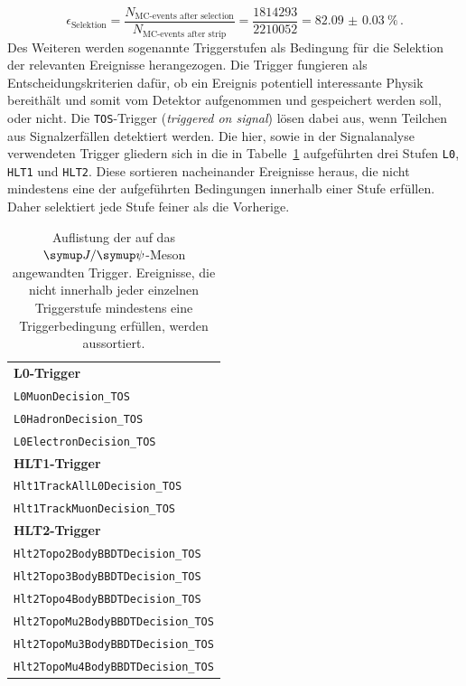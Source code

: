 %
\begin{equation}
  \epsilon_\text{Selektion}=\frac{N_\text{MC-events after selection}}{N_\text{MC-events after strip}}=\frac{1814293}{2210052}=\SI{82.09(3)}{\percent} \, .
  \label{eq:eff_strip1}
\end{equation}
%
Des Weiteren werden sogenannte Triggerstufen als Bedingung für die Selektion der relevanten Ereignisse herangezogen. Die Trigger fungieren als Entscheidungskriterien dafür, ob ein Ereignis potentiell interessante Physik bereithält und somit vom Detektor aufgenommen und gespeichert werden soll, oder nicht. Die \texttt{TOS}-Trigger (\textit{triggered on signal}) lösen dabei aus, wenn Teilchen aus Signalzerfällen detektiert werden. Die hier, sowie in der Signalanalyse \cite{ba-maik} verwendeten Trigger gliedern sich in die in Tabelle~\ref{tab:trigger} aufgeführten drei Stufen \texttt{L0}, \texttt{HLT1} und \texttt{HLT2}. Diese sortieren nacheinander Ereignisse heraus, die nicht mindestens eine der aufgeführten Bedingungen innerhalb einer Stufe erfüllen. Daher selektiert jede Stufe feiner als die Vorherige.
%
\begin{table}[htb]
  \centering
  \caption{Auflistung der auf das $\jpsi$-Meson angewandten Trigger.
  Ereignisse, die nicht innerhalb jeder einzelnen Triggerstufe mindestens eine Triggerbedingung erfüllen, werden aussortiert.}
  \begin{tabular}{l}
    \toprule
    \textbf{L0-Trigger}                                 \\
    \quad\texttt{L0MuonDecision\_TOS}              \\
    \quad\texttt{L0HadronDecision\_TOS}            \\
    \quad\texttt{L0ElectronDecision\_TOS}          \\
    \midrule
    \textbf{HLT1-Trigger}                               \\
    \quad\texttt{Hlt1TrackAllL0Decision\_TOS}      \\
    \quad\texttt{Hlt1TrackMuonDecision\_TOS}       \\
    \midrule
    \textbf{HLT2-Trigger}                               \\
    \quad\texttt{Hlt2Topo2BodyBBDTDecision\_TOS}   \\
    \quad\texttt{Hlt2Topo3BodyBBDTDecision\_TOS}   \\
    \quad\texttt{Hlt2Topo4BodyBBDTDecision\_TOS}   \\
    \quad\texttt{Hlt2TopoMu2BodyBBDTDecision\_TOS} \\
    \quad\texttt{Hlt2TopoMu3BodyBBDTDecision\_TOS} \\
    \quad\texttt{Hlt2TopoMu4BodyBBDTDecision\_TOS} \\
    \bottomrule
  \end{tabular}
  \label{tab:trigger}
\end{table}
